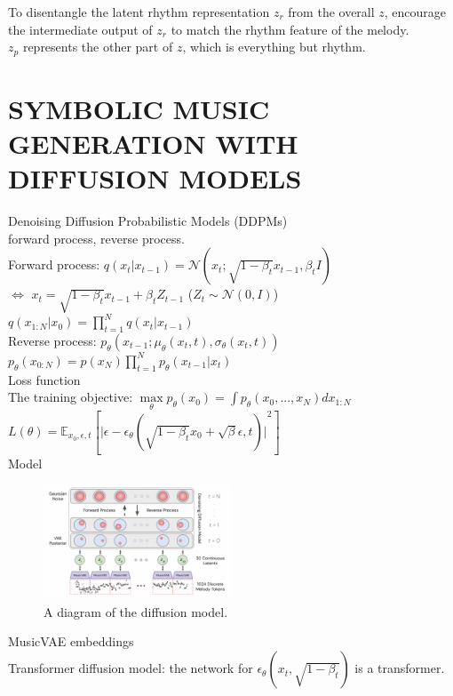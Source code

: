 \documentclass{article}
\begin{document}
\noindent
To disentangle the latent rhythm representation $z_r$ from the overall $z$, encourage the intermediate output of $z_r$ to match the rhythm feature of the melody.\\
$z_p$ represents the other part of $z$, which is everything but rhythm.

\section{SYMBOLIC MUSIC GENERATION WITH DIFFUSION MODELS}
Denoising Diffusion Probabilistic Models (DDPMs)\\
forward process, reverse process.\\
Forward process: $q(x_t|x_{t-1}) = \mathcal{N}(x_t; \sqrt{1 - \beta_t}x_{t-1}, \beta_t I)$\\
$\Leftrightarrow$ $x_t = \sqrt{1 - \beta_t}x_{t-1} + \beta_tZ_{t-1}$ ($Z_t \sim \mathcal{N}(0, I)$)\\
$q(x_{1:N}|x_0) = \prod\limits_{t=1}^Nq(x_t|x_{t-1})$\\
Reverse process: $p_\theta(x_{t-1}; \mu_\theta(x_t,t), \sigma_\theta(x_t,t))$\\
$p_\theta(x_{0:N}) = p(x_N)\prod\limits_{t=1}^Np_\theta(x_{t-1}|x_t)$\\
Loss function\\
The training objective: $\max\limits_\theta{p_\theta(x_0)} = \int p_\theta(x_0,...,x_N)dx_{1:N}$\\
$L(\theta) = \mathbb{E}_{x_0,\epsilon,t}[{\vert \epsilon - \epsilon_\theta(\sqrt{1-\beta_t}x_0 + \sqrt{\beta}\epsilon, t) \vert}^2]$\\

\noindent
Model
\begin{figure}[H]
	\centerline{
   \includegraphics[width=0.5\textwidth]{Fig15.png}}
   \caption{A diagram of the diffusion model.}
   \label{fig:example}
\end{figure}
\noindent
MusicVAE embeddings\\
Transformer diffusion model: the network for $\epsilon_\theta(x_t, \sqrt{1-\beta_t})$ is a transformer.\\
\end{document}
